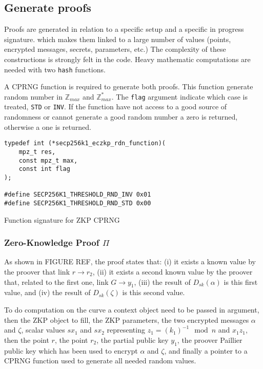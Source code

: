\subsection{Generate proofs}

Proofs are generated in relation to a specific setup and a specific in progress
signature. which makes them linked to a large number of values (points, encrypted
messages, secrets, parameters, etc.) The complexity of these constructions is
strongly felt in the code. Heavy mathematic computations are needed with two
\texttt{hash} functions.

A CPRNG function is required to generate both proofs. This function generate
random number in $\mathbb{Z}_{max}$ and $\mathbb{Z}_{max}^*$. The \texttt{flag}
argument indicate which case is treated, \texttt{STD} or \texttt{INV}. If the
function have not access to a good source of randomness or cannot generate a
good random number a zero is returned, otherwise a one is returned.

\begin{listing}
  \begin{verbatim}
typedef int (*secp256k1_eczkp_rdn_function)(
    mpz_t res,
    const mpz_t max,
    const int flag
);

#define SECP256K1_THRESHOLD_RND_INV 0x01
#define SECP256K1_THRESHOLD_RND_STD 0x00
  \end{verbatim}
	\caption{Function signature for ZKP CPRNG}
	\label{lst:funcSigZKPCPRGN}
\end{listing}

\subsubsection{Zero-Knowledge Proof $\Pi$}

As shown in FIGURE REF, the proof states that: (i) it exists a known value by
the proover that link $r \rightarrow r_2$, (ii) it exists a second known value by
the proover that, related to the first one, link $G \rightarrow y_1$, (iii) the
result of $D_{sk}(\alpha)$ is this first value, and (iv) the result of
$D_{sk}(\zeta)$ is this second value.

To do computation on the curve a context object need to be passed in argument,
then the ZKP object to fill, the ZKP parameters, the two encrypted messages
$\alpha$ and $\zeta$, scalar values $sx_1$ and $sx_2$ representing
$z_1 = (k_1)^{-1} \mod n$ and $x_1z_1$, then
the point $r$, the point $r_2$, the partial public key $y_1$, the proover Paillier
public key which has been used to encrypt $\alpha$ and $\zeta$, and finally a
pointer to a CPRNG function used to generate all needed random values.

